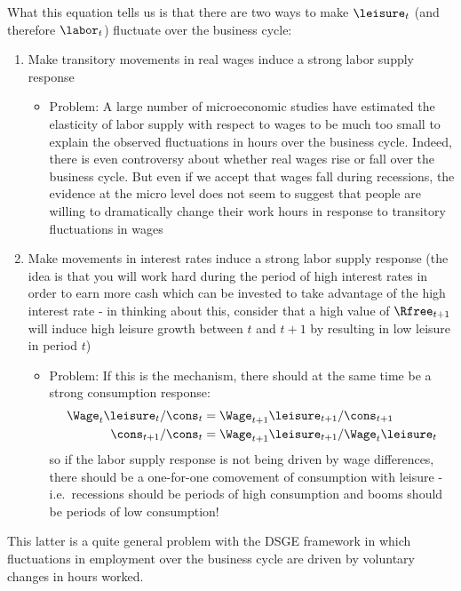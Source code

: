 What this equation tells us is that there are two ways to make $\leisure_{t}$
(and therefore $\labor_{t}$) fluctuate over the business cycle:
\begin{enumerate}
        \item  Make transitory movements in real wages induce a strong labor supply response
        \begin{itemize}
                \item  Problem:  A large number of microeconomic studies have estimated
the elasticity of labor supply with respect to wages to be much too small to explain
the observed fluctuations in hours over the business cycle.  Indeed, there is even controversy
about whether real wages rise or fall over the business cycle.  But even if we accept that
wages fall during recessions, the evidence at the micro level does not seem to suggest that people are willing
to dramatically change their work hours in response to transitory fluctuations in wages
        \end{itemize}

        \item Make movements in interest rates induce a strong labor
        supply response (the idea is that you will work hard during the
        period of high interest rates in order to earn more cash
        which can be invested to take advantage of the high interest rate - in thinking about this,
        consider that a high value of $\Rfree_{t+1}$ will induce high leisure
        growth between $t$ and $t+1$ by resulting in low leisure in period
        $t$)
\begin{itemize}
        \item  Problem:  If this is the mechanism, there should at the same time be a strong consumption
        response:
        \begin{equation}\begin{gathered}\begin{aligned}
                \Wage_{t}\leisure_{t}/\cons_{t} & =  \Wage_{t+1}\leisure_{t+1}/\cons_{t+1}  \\
                \cons_{t+1}/\cons_{t} & =  \Wage_{t+1}\leisure_{t+1}/\Wage_{t}\leisure_{t}
        \end{aligned}\end{gathered}\end{equation}
     so if the labor supply response is not being driven by wage differences,
     there should be a one-for-one comovement of consumption with leisure - i.e.\
     recessions should be periods of high consumption and booms should be periods
     of low consumption!

\end{itemize}
\end{enumerate}

This latter is a quite general problem with the DSGE framework in which
fluctuations in employment over the business cycle are driven by
voluntary changes in hours worked.

\renewcommand\refname{\noindent{\href{http://www.econ2.jhu.edu/people/ccarroll/public/lecturenotes/DSGEModels/RBC-Prescott/RBC-Prescott.bib}{\large References {\small (click to download \texttt{.bib} file)}}}}



